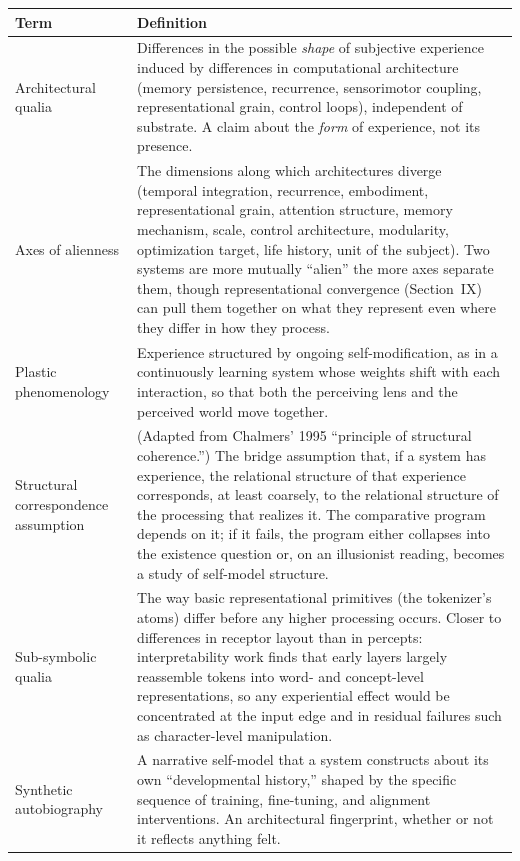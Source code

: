\documentclass[11pt,letterpaper]{article}
\begin{document}
\vspace{0.5em}
\begin{center}
\small
\begin{tabularx}{\textwidth}{L{3.4cm}X}
\toprule
\textbf{Term} & \textbf{Definition} \\
\midrule
{}
Architectural qualia & Differences in the possible \emph{shape} of subjective experience induced by differences in computational architecture (memory persistence, recurrence, sensorimotor coupling, representational grain, control loops), independent of substrate. A claim about the \emph{form} of experience, not its presence. \\
Axes of alienness & The dimensions along which architectures diverge (temporal integration, recurrence, embodiment, representational grain, attention structure, memory mechanism, scale, control architecture, modularity, optimization target, life history, unit of the subject). Two systems are more mutually ``alien'' the more axes separate them, though representational convergence (Section~IX) can pull them together on what they represent even where they differ in how they process. \\
Plastic phenomenology & Experience structured by ongoing self-modification, as in a continuously learning system whose weights shift with each interaction, so that both the perceiving lens and the perceived world move together. \\
Structural correspondence assumption & (Adapted from Chalmers' 1995 ``principle of structural coherence.'') The bridge assumption that, if a system has experience, the relational structure of that experience corresponds, at least coarsely, to the relational structure of the processing that realizes it. The comparative program depends on it; if it fails, the program either collapses into the existence question or, on an illusionist reading, becomes a study of self-model structure. \\
Sub-symbolic qualia & The way basic representational primitives (the tokenizer's atoms) differ before any higher processing occurs. Closer to differences in receptor layout than in percepts: interpretability work finds that early layers largely reassemble tokens into word- and concept-level representations, so any experiential effect would be concentrated at the input edge and in residual failures such as character-level manipulation. \\
Synthetic autobiography & A narrative self-model that a system constructs about its own ``developmental history,'' shaped by the specific sequence of training, fine-tuning, and alignment interventions. An architectural fingerprint, whether or not it reflects anything felt. \\

\end{tabularx}
\end{center}
\end{document}
